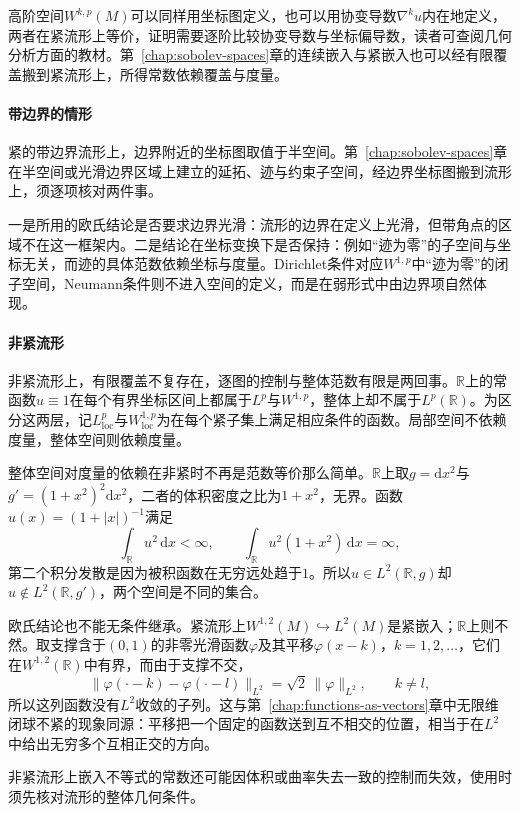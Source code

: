 高阶空间$W^{k,p}(M)$可以同样用坐标图定义，也可以用协变导数$\nabla^ku$内在地定义，两者在紧流形上等价，证明需要逐阶比较协变导数与坐标偏导数，读者可查阅几何分析方面的教材。第~\ref{chap:sobolev-spaces}章的连续嵌入与紧嵌入也可以经有限覆盖搬到紧流形上，所得常数依赖覆盖与度量。

\paragraph{带边界的情形}
紧的带边界流形上，边界附近的坐标图取值于半空间。第~\ref{chap:sobolev-spaces}章在半空间或光滑边界区域上建立的延拓、迹与约束子空间，经边界坐标图搬到流形上，须逐项核对两件事。

一是所用的欧氏结论是否要求边界光滑：流形的边界在定义上光滑，但带角点的区域不在这一框架内。二是结论在坐标变换下是否保持：例如“迹为零”的子空间与坐标无关，而迹的具体范数依赖坐标与度量。Dirichlet条件对应$W^{1,p}$中“迹为零”的闭子空间，Neumann条件则不进入空间的定义，而是在弱形式中由边界项自然体现。

\paragraph{非紧流形}
非紧流形上，有限覆盖不复存在，逐图的控制与整体范数有限是两回事。$\mathbb R$上的常函数$u\equiv1$在每个有界坐标区间上都属于$L^p$与$W^{1,p}$，整体上却不属于$L^p(\mathbb R)$。为区分这两层，记$L^p_{\mathrm{loc}}$与$W^{1,p}_{\mathrm{loc}}$为在每个紧子集上满足相应条件的函数。局部空间不依赖度量，整体空间则依赖度量。

整体空间对度量的依赖在非紧时不再是范数等价那么简单。$\mathbb R$上取$g=\mathrm dx^2$与$g'=(1+x^2)^2\mathrm dx^2$，二者的体积密度之比为$1+x^2$，无界。函数$u(x)=(1+\lvert x\rvert)^{-1}$满足
\[
\int_{\mathbb R}u^2\,\mathrm dx<\infty,\qquad\int_{\mathbb R}u^2(1+x^2)\,\mathrm dx=\infty ,
\]
第二个积分发散是因为被积函数在无穷远处趋于$1$。所以$u\in L^2(\mathbb R,g)$却$u\notin L^2(\mathbb R,g')$，两个空间是不同的集合。

欧氏结论也不能无条件继承。紧流形上$W^{1,2}(M)\hookrightarrow L^2(M)$是紧嵌入；$\mathbb R$上则不然。取支撑含于$(0,1)$的非零光滑函数$\varphi$及其平移$\varphi(x-k)$，$k=1,2,\ldots$，它们在$W^{1,2}(\mathbb R)$中有界，而由于支撑不交，
\[
\lVert\varphi(\cdot-k)-\varphi(\cdot-l)\rVert_{L^2}=\sqrt2\,\lVert\varphi\rVert_{L^2},\qquad k\neq l ,
\]
所以这列函数没有$L^2$收敛的子列。这与第~\ref{chap:functions-as-vectors}章中无限维闭球不紧的现象同源：平移把一个固定的函数送到互不相交的位置，相当于在$L^2$中给出无穷多个互相正交的方向。

非紧流形上嵌入不等式的常数还可能因体积或曲率失去一致的控制而失效，使用时须先核对流形的整体几何条件。
